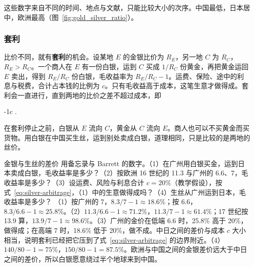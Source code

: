 
这些数字来自不同的时间、地点与文献，只能比较大小的次序。中国最低，日本居中，欧洲最高（图~\ref{fig:gold_silver_ratio}）。

\subsubsection{套利}
比价不同，就有\textbf{套利}的机会。设某地 $E$ 的金银比价为 $R_E$，另一地 $C$ 为 $R_C$，$R_E>R_C$。一个商人在 $E$ 有一份白银，运到 $C$ 买成 $1/R_C$ 份黄金，再把黄金运回 $E$ 卖出，得到 $R_E/R_C$ 份白银，毛收益率为 $R_E/R_C-1$。运费、保险、途中的利息与税费，合计占本钱的比例为 $c$。只有毛收益高于成本，这笔生意才做得成。套利会一直进行，直到两地的比价之差不超过成本，即
\begin{keyeq}
-1\;\le\;c .\label{eq:silver-arbitrage}
\end{keyeq}
在套利停止之前，白银从 $E$ 流向 $C$，黄金从 $C$ 流向 $E$。商人也可以不买黄金而买货物。用白银在中国买生丝，运到别处卖成白银，道理相同，只是比较的是两地的丝价。

\begin{example}{金银与生丝的差价}\label{ex:silver-arbitrage}
用备忘录与 Barrett 的数字。（1）在广州用白银买金，运到日本卖成白银，毛收益率是多少？（2）按欧洲 16 世纪的 11.3 与广州的 6.6、7，毛收益率是多少？（3）设运费、风险与利息合计 $c=20\%$（教学假设），按式~\eqref{eq:silver-arbitrage}，（1）中的生意做得成吗？（4）生丝从广州运到日本，毛收益率是多少？
\solution （1）按广州的 7，$8.3/7-1\approx18.6\%$；按 6.6，$8.3/6.6-1\approx25.8\%$。（2）$11.3/6.6-1\approx71.2\%$，$11.3/7-1\approx61.4\%$；17 世纪按 13.9 算，$13.9/7-1\approx98.6\%$。（3）广州的金价在低端 6.6 时，25.8\% 高于 20\%，做得成；在高端 7 时，18.6\% 低于 20\%，做不成。中日之间的差价与成本 $c$ 大小相当，说明套利已经把它压到了式~\eqref{eq:silver-arbitrage} 的边界附近。（4）$140/80-1=75\%$，$150/80-1=87.5\%$。欧洲与中国之间的金银差价远大于中日之间的差价，所以白银愿意绕过半个地球来到中国。
\end{example}

